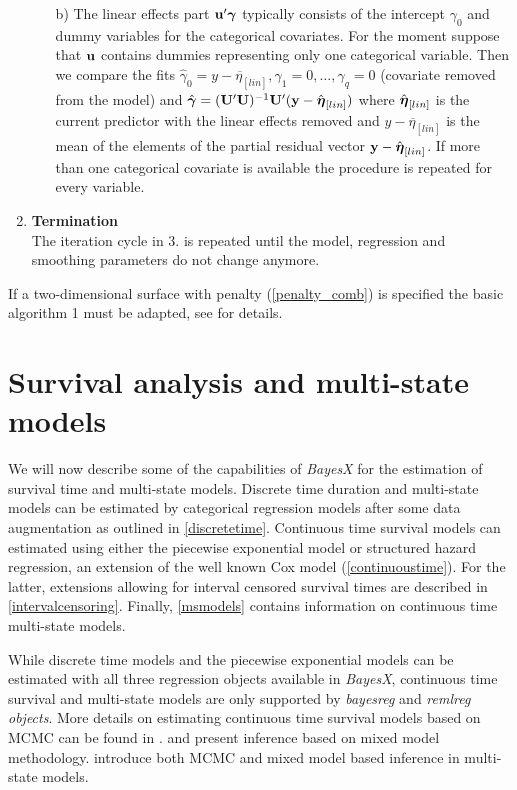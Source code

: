 \documentclass[11pt,a4paper,twoside]{bayesxarticle}
\begin{document}
\begin{enumerate}
\begin{itemize}
\item[b)] The linear effects part $\mathbf{u}'\boldsymbol{\gamma}$  typically consists of the intercept $\gamma_0$ and
dummy variables for the categorical covariates. For the moment suppose that $\mathbf{u}$ contains
dummies representing only one categorical variable. Then we compare the fits
$\hat{\gamma}_0 = \overline{y-\eta_{[lin]}}, \gamma_1=0,\dots,\gamma_q=0$ (covariate removed from the model) and
$\hat{\boldsymbol{\gamma}} = (\mathbf{U}'\mathbf{U})^{-1} \mathbf{U}' (\mathbf{y} - \hat{\boldsymbol{\eta}}_{[lin]})$ where
$\hat{\boldsymbol{\eta}}_{[lin]}$ is the current predictor with the linear effects removed and
$\overline{y-\eta_{[lin]}}$ is the mean of the elements of the partial residual vector
$\mathbf{y} - \hat{\boldsymbol{\eta}}_{[lin]}$. If more than one categorical covariate is available
the procedure is repeated for every variable.
\end{itemize}
\item {\bf Termination} \\
The iteration cycle in 3. is repeated until the model, regression and smoothing parameters do not change anymore.
\end{enumerate}
If a two-dimensional surface with penalty (\ref{penalty_comb}) is specified the basic algorithm 1 must be adapted, see
 for details.


\section{Survival analysis and multi-state models}
\label{survivalAnalysis}

We will now describe some of the capabilities of {\em BayesX} for
the estimation of survival time and multi-state models. Discrete
time duration and multi-state models can be estimated by categorical
regression models after some data augmentation as outlined in
\autoref{discretetime}. Continuous time survival models can
estimated using either the piecewise exponential model or structured
hazard regression, an extension of the well known Cox model
(\autoref{continuoustime}). For the latter, extensions allowing for
interval censored survival times are described in
\autoref{intervalcensoring}. Finally, \autoref{msmodels} contains
information on continuous time multi-state models.

While discrete time models and the piecewise exponential models can be estimated with all three regression objects available in
{\em BayesX}, continuous time survival and multi-state models are only supported by {\em bayesreg} and {\em remlreg objects}.
More details on estimating continuous time survival models based on MCMC can be found in .
 and  present inference based on mixed model methodology. 
introduce both MCMC and mixed model based inference in multi-state models.
\end{document}
